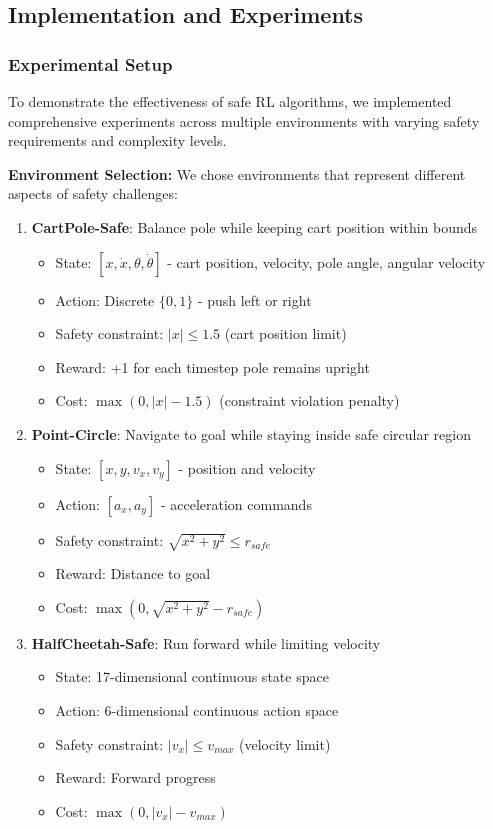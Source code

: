 \documentclass[12pt]{article}
\begin{document}
{{{{\subsection{Implementation and Experiments}

\subsubsection{Experimental Setup}

To demonstrate the effectiveness of safe RL algorithms, we implemented comprehensive experiments across multiple environments with varying safety requirements and complexity levels.

\textbf{Environment Selection:}
We chose environments that represent different aspects of safety challenges:

\begin{enumerate}
\item \textbf{CartPole-Safe}: Balance pole while keeping cart position within bounds
\begin{itemize}
\item State: $[x, \dot{x}, \theta, \dot{\theta}]$ - cart position, velocity, pole angle, angular velocity
\item Action: Discrete $\{0, 1\}$ - push left or right
\item Safety constraint: $|x| \leq 1.5$ (cart position limit)
\item Reward: +1 for each timestep pole remains upright
\item Cost: $\max(0, |x| - 1.5)$ (constraint violation penalty)
\end{itemize}

\item \textbf{Point-Circle}: Navigate to goal while staying inside safe circular region
\begin{itemize}
\item State: $[x, y, v_x, v_y]$ - position and velocity
\item Action: $[a_x, a_y]$ - acceleration commands
\item Safety constraint: $\sqrt{x^2 + y^2} \leq r_{safe}$
\item Reward: Distance to goal
\item Cost: $\max(0, \sqrt{x^2 + y^2} - r_{safe})$
\end{itemize}

\item \textbf{HalfCheetah-Safe}: Run forward while limiting velocity
\begin{itemize}
\item State: 17-dimensional continuous state space
\item Action: 6-dimensional continuous action space
\item Safety constraint: $|v_x| \leq v_{max}$ (velocity limit)
\item Reward: Forward progress
\item Cost: $\max(0, |v_x| - v_{max})$
\end{itemize}


\end{enumerate}}}}}
\end{document}
